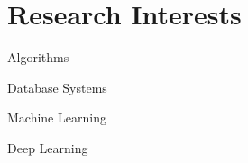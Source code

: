 
\section{Research Interests}\vspace{-1.0em}

\begin{multicols}{2}
	\begin{compactitem}
		\item Algorithms 
		\item Database Systems
		\item Machine Learning
		\item Deep Learning 
	\end{compactitem}
\end{multicols}

